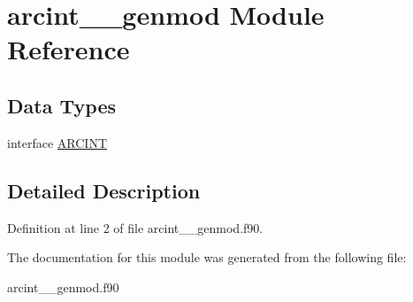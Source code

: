 \hypertarget{classarcint____genmod}{\section{arcint\+\_\+\+\_\+genmod Module Reference}
\label{classarcint____genmod}
}
\subsection*{Data Types}
\begin{DoxyCompactItemize}
\item 
interface \hyperlink{interfacearcint____genmod_1_1_a_r_c_i_n_t}{A\+R\+C\+I\+N\+T}
\end{DoxyCompactItemize}


\subsection{Detailed Description}


Definition at line 2 of file arcint\+\_\+\+\_\+genmod.\+f90.



The documentation for this module was generated from the following file\+:\begin{DoxyCompactItemize}
\item 
arcint\+\_\+\+\_\+genmod.\+f90\end{DoxyCompactItemize}
